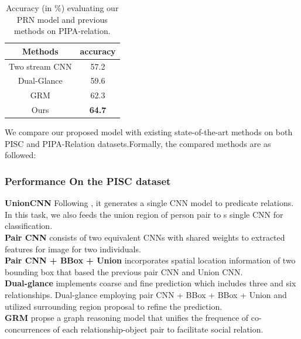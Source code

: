 \documentclass{article}
\begin{document}
\begin{table}[htpb]
  \centering
  \caption{Accuracy (in \%) evaluating our PRN model and previous methods on PIPA-relation.}
  \label{tab:pipa_table}
  \begin{tabular}{c|c}
    \hline
    Methods & accuracy \\
    \hline\hline
    Two stream CNN \cite{DBLP:conf/cvpr/ZhangPTFB15} & 57.2 \\
    Dual-Glance \cite{DBLP:conf/iccv/LiWZK17} & 59.6 \\
    GRM \cite{DBLP:conf/ijcai/WangCRYCL18} & 62.3 \\
    \hline
    Ours & \textbf{64.7}\\
    \hline
  \end{tabular}
\end{table}

We compare our proposed model with existing state-of-the-art methods on both PISC and PIPA-Relation datasets.Formally, the compared methods are as followed:

\subsubsection{Performance On the PISC dataset}

{\bf UnionCNN}  Following \cite{DBLP:conf/eccv/LuKBL16}, it generates a single CNN model to predicate relations. In this task, we also feeds the union region of person pair to s single CNN for classification.\\
{\bf Pair CNN}\cite{DBLP:conf/iccv/LiWZK17} consists of two equivalent CNNs with shared weights to extracted features for image for two individuals.\\
{\bf Pair CNN + BBox + Union}\cite{DBLP:conf/iccv/LiWZK17} incorporates spatial location information of two bounding box that based the previous pair CNN and Union CNN.\\
{\bf Dual-glance}\cite{DBLP:conf/iccv/LiWZK17} implements coarse and fine prediction which includes three and six relationships. Dual-glance employing pair CNN + BBox + BBox + Union and utilized surrounding region proposal to refine the prediction.\\
{\bf GRM}\cite{DBLP:conf/ijcai/WangCRYCL18} propse a graph reasoning model that unifies the frequence of co-concurrences of each relationship-object pair to facilitate social relation.
\end{document}
